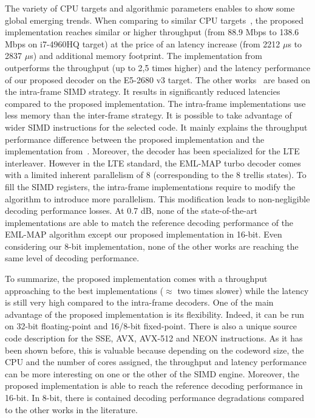The variety of CPU targets and algorithmic parameters enables to
show some global emerging trends. When comparing to similar CPU
targets~\cite{Zhang2012,Wu2013}, the proposed implementation reaches similar or
higher throughput (from 88.9 Mbps to 138.6 Mbps on i7-4960HQ target) at the
price of an latency increase (from 2212 $\mu$s to 2837 $\mu$s) and additional
memory footprint. The implementation from~\cite{LeGal2019a} outperforms the
throughput (up to 2,5 times higher) and the latency performance of our proposed
decoder on the E5-2680 v3 target. The other works~\cite{Zhang2012,Wu2013,
LeGal2019a} are based on the intra-frame SIMD strategy. It results in
significantly reduced latencies compared to the proposed implementation. The
intra-frame implementations use less memory than the inter-frame strategy. It is
possible to take advantage of wider SIMD instructions for the selected code. It
mainly explains the throughput performance difference between the proposed
implementation and the implementation from~\cite{LeGal2019a}. Moreover, the
decoder has been specialized for the LTE interleaver. However in the LTE
standard, the EML-MAP turbo decoder comes with a limited inherent parallelism of
8 (corresponding to the 8 trellis states). To fill the SIMD registers, the
intra-frame implementations require to modify the algorithm to introduce more
parallelism. This modification leads to non-negligible decoding performance
losses. At 0.7 dB, none of the state-of-the-art implementations are able to
match the reference decoding performance of the EML-MAP algorithm except our
proposed implementation in 16-bit. Even considering our 8-bit implementation,
none of the other works are reaching the same level of decoding performance.

To summarize, the proposed implementation comes with a throughput approaching to
the best implementations ($\approx$ two times slower) while the latency is still
very high compared to the intra-frame decoders. One of the main advantage of the
proposed implementation is its flexibility. Indeed, it can be run on 32-bit
floating-point and 16/8-bit fixed-point. There is also a unique source code
description for the SSE, AVX, AVX-512 and NEON instructions. As it has been
shown before, this is valuable because depending on the codeword size, the CPU
and the number of cores assigned, the throughput and latency performance can be
more interesting on one or the other of the SIMD engine. Moreover, the proposed
implementation is able to reach the reference decoding performance in 16-bit.
In 8-bit, there is contained decoding performance degradations compared to the
other works in the literature.

